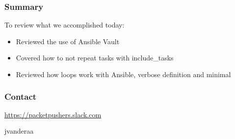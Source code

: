 \documentclass[aspectratio=169]{beamer}
\begin{document}
\begin{frame}
  \frametitle{Summary}
    To review what we accomplished today:
    \begin{itemize}
      \item <2-> Reviewed the use of Ansible Vault
      \item <3-> Covered how to not repeat tasks with include\_tasks
      \item <4-> Reviewed how loops work with Ansible, verbose definition and minimal
    \end{itemize}
\end{frame}

\begin{frame}
    \frametitle{Contact}
    \huge
    \begin{center}
      \url{https://packetpushers.slack.com}
    \end{center}
    \begin{center}
      \normalsize
      \faSlack \hspace{.1cm}jvanderaa  
    \end{center}
  \end{frame}
\end{document}
